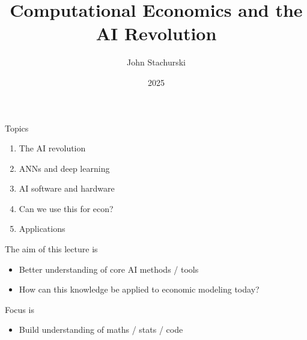 


\title{Computational Economics and the AI Revolution}



\author{John Stachurski}


\date{2025}




\begin{frame}
  \titlepage
\end{frame}



\begin{frame}{Topics}

    \begin{enumerate}
        \item The AI revolution
        \vspace{0.5em}
        \item ANNs and deep learning
        \vspace{0.5em}
        \item AI software and hardware
        \vspace{0.5em}
        \item Can we use this for econ?
        \vspace{0.5em}
        \item Applications
    \end{enumerate}

\end{frame}

\begin{frame}
    
    The aim of this lecture is 
    \medskip


    \begin{itemize}
        \item Better understanding of core AI methods / tools
        \medskip
        \item How can this knowledge be applied to economic modeling today?
    \end{itemize}

    \medskip
    \medskip
    Focus is 
    \medskip


    \begin{itemize}
        \item Build understanding of maths / stats / code
    \end{itemize}

\end{frame}




